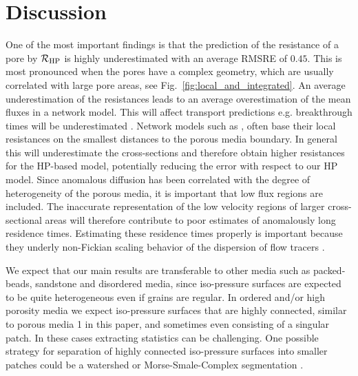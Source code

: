 \documentclass[draft]{agujournal2019}
\begin{document}
\section{Discussion}

One of the most important findings is that the prediction of the resistance of a pore by $\mathcal{R}_{\rm{HP}}$ is highly underestimated with an average RMSRE of $0.45$. This is most pronounced when the pores have a complex geometry, which are usually correlated with large pore areas, see Fig.~\ref{fig:local_and_integrated}. An average underestimation of the resistances leads to an average overestimation of the mean fluxes in a network model. This will affect transport predictions e.g. breakthrough times will be underestimated \cite{dentz_mechanisms_2018}. Network models such as \cite{alim_local_2017}, often base their local resistances on the smallest distances to the porous media boundary. In general this will underestimate the cross-sections and therefore obtain higher resistances for the HP-based model, potentially reducing the error with respect to our HP model. Since anomalous diffusion has been correlated with the degree of heterogeneity of the porous media, it is important that low flux regions are included. The inaccurate representation of the low velocity regions of larger cross-sectional areas will therefore contribute to poor estimates of anomalously long residence times. Estimating these residence times properly is important because they underly non-Fickian scaling behavior of the dispersion of flow tracers \cite{dentz_mechanisms_2018,dentz_delay_2006}.

We expect that our main results are transferable to other media such as packed-beads, sandstone and disordered media, since iso-pressure surfaces are expected to be quite heterogeneous even if grains are regular. In ordered and/or high porosity media we expect iso-pressure surfaces that are highly connected, similar to porous media 1 in this paper, and sometimes even consisting of a singular patch. In these cases extracting statistics can be challenging. One possible strategy for separation of highly connected iso-pressure surfaces into smaller patches could be a watershed or Morse-Smale-Complex segmentation \cite{tierny_topology_2018}. 
\end{document}
